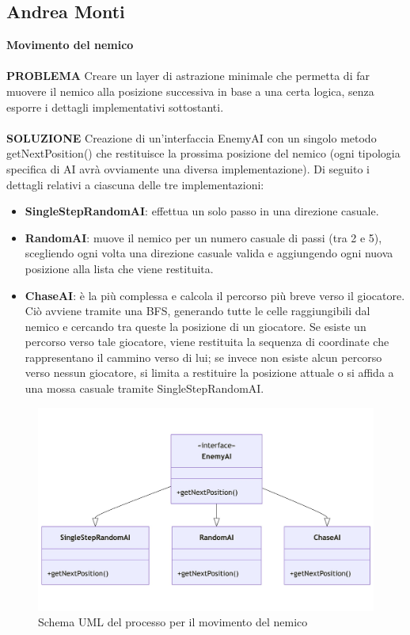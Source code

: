 \documentclass[a4paper,12pt]{report}
\begin{document}
\subsection{Andrea Monti}
\textbf{Movimento del nemico}
\\
\\
\textbf{PROBLEMA}
Creare un layer di astrazione minimale che permetta di far muovere il nemico alla posizione successiva in base a una certa logica, 
senza esporre i dettagli implementativi sottostanti.
\\
\\
\textbf{SOLUZIONE}
Creazione di un’interfaccia EnemyAI con un singolo metodo getNextPosition() che restituisce la 
prossima posizione del nemico (ogni tipologia specifica di AI avrà ovviamente una diversa implementazione). 
Di seguito i dettagli relativi a ciascuna delle tre implementazioni:
\begin{itemize}
	\item \textbf{SingleStepRandomAI}: effettua un solo passo in una direzione casuale. 
	\item \textbf{RandomAI}: muove il nemico per un numero casuale di passi (tra 2 e 5), scegliendo ogni volta una 
	direzione casuale valida e aggiungendo ogni nuova posizione alla lista che viene restituita.
	\item \textbf{ChaseAI}: è la più complessa e calcola il percorso più breve verso il giocatore.
	Ciò avviene tramite una BFS, generando tutte le celle raggiungibili dal nemico e cercando tra queste la posizione 
	di un giocatore. Se esiste un percorso verso tale giocatore, viene restituita la sequenza di coordinate che rappresentano 
	il cammino verso di lui; se invece non esiste alcun percorso verso nessun giocatore, si limita a restituire la posizione 
	attuale o si affida a una mossa casuale tramite SingleStepRandomAI.
\end{itemize}
\begin{figure}[H]
	\centering{}
	\includegraphics[width=14cm]{img/MovimentoNemico.png}
	\caption{Schema UML del processo per il movimento del nemico}
	\label{img:Movimento Nemico}
\end{figure}
\end{document}
